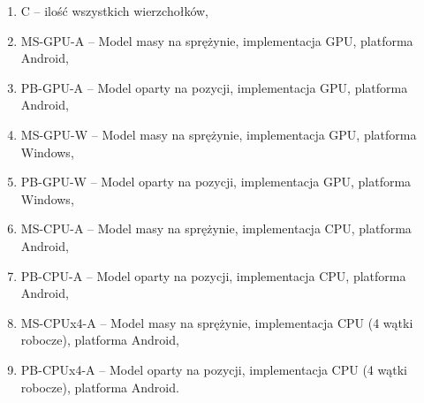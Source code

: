 		\begin{enumerate}
			\item C -- ilość wszystkich wierzchołków,
			\item MS-GPU-A -- Model masy na sprężynie, implementacja GPU, platforma Android,
			\item PB-GPU-A -- Model oparty na pozycji, implementacja GPU, platforma Android,
			\item MS-GPU-W -- Model masy na sprężynie, implementacja GPU, platforma Windows,
			\item PB-GPU-W -- Model oparty na pozycji, implementacja GPU, platforma Windows,
			\item MS-CPU-A -- Model masy na sprężynie, implementacja CPU, platforma Android,
			\item PB-CPU-A -- Model oparty na pozycji, implementacja CPU, platforma Android,
			\item MS-CPUx4-A -- Model masy na sprężynie, implementacja CPU (4 wątki robocze), platforma Android,
			\item PB-CPUx4-A -- Model oparty na pozycji, implementacja CPU (4 wątki robocze), platforma Android.
			\newline
		\end{enumerate}
		
		
		
		
